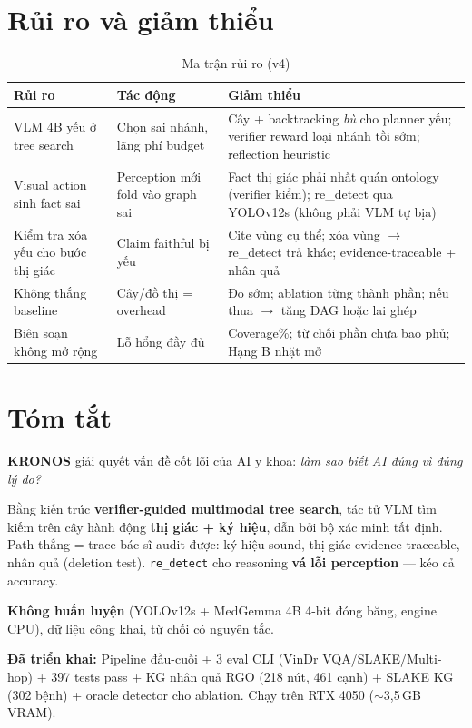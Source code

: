 \documentclass[11pt,a4paper]{article}
\begin{document}
\section{Rủi ro và giảm thiểu}

\begin{table}[H]
\centering\small
\renewcommand{\arraystretch}{1.3}
\begin{tabular}{p{3.2cm} p{4cm} p{5.5cm}}
\toprule
\textbf{Rủi ro} & \textbf{Tác động} & \textbf{Giảm thiểu} \\
\midrule
VLM 4B yếu ở tree search & Chọn sai nhánh, lãng phí budget & Cây + backtracking \emph{bù} cho planner yếu; verifier reward loại nhánh tồi sớm; reflection heuristic \\
Visual action sinh fact sai & Perception mới fold vào graph sai & Fact thị giác phải nhất quán ontology (verifier kiểm); re\_detect qua YOLOv12s (không phải VLM tự bịa) \\
Kiểm tra xóa yếu cho bước thị giác & Claim faithful bị yếu & Cite vùng cụ thể; xóa vùng $\to$ re\_detect trả khác; evidence-traceable + nhân quả \\
Không thắng baseline & Cây/đồ thị = overhead & Đo sớm; ablation từng thành phần; nếu thua $\to$ tăng DAG hoặc lai ghép \\
Biên soạn không mở rộng & Lỗ hổng đầy đủ & Coverage\%; từ chối phần chưa bao phủ; Hạng B nhặt mở \\
\bottomrule
\end{tabular}
\caption{Ma trận rủi ro (v4)}
\end{table}

\section{Tóm tắt}

\begin{highlightbox}
\textbf{KRONOS} giải quyết vấn đề cốt lõi của AI y khoa: \emph{làm sao biết AI đúng vì đúng lý do?}

Bằng kiến trúc \textbf{verifier-guided multimodal tree search}, tác tử VLM tìm kiếm trên cây hành động \textbf{thị giác + ký hiệu}, dẫn bởi bộ xác minh tất định. Path thắng = trace bác sĩ audit được: ký hiệu sound, thị giác evidence-traceable, nhân quả (deletion test). \texttt{re\_detect} cho reasoning \textbf{vá lỗi perception} --- kéo cả accuracy.

\textbf{Không huấn luyện} (YOLOv12s + MedGemma 4B 4-bit đóng băng, engine CPU), dữ liệu công khai, từ chối có nguyên tắc.

\medskip
\textbf{Đã triển khai:} Pipeline đầu-cuối + 3 eval CLI (VinDr VQA/SLAKE/Multi-hop) + 397 tests pass + KG nhân quả RGO (218 nút, 461 cạnh) + SLAKE KG (302 bệnh) + oracle detector cho ablation. Chạy trên RTX 4050 ($\sim$3,5\,GB VRAM).
\end{highlightbox}
\end{document}
